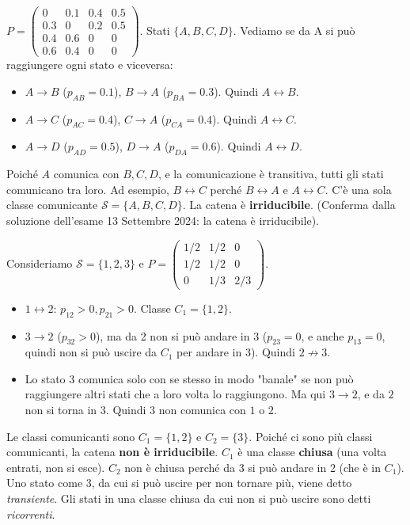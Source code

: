 \begin{example}
$P = \begin{pmatrix} 0 & 0.1 & 0.4 & 0.5 \\ 0.3 & 0 & 0.2 & 0.5 \\ 0.4 & 0.6 & 0 & 0 \\ 0.6 & 0.4 & 0 & 0 \end{pmatrix}$. Stati $\{A,B,C,D\}$.
Vediamo se da A si può raggiungere ogni stato e viceversa:
\begin{itemize}
    \item $A \to B$ ($p_{AB}=0.1$), $B \to A$ ($p_{BA}=0.3$). Quindi $A \leftrightarrow B$.
    \item $A \to C$ ($p_{AC}=0.4$), $C \to A$ ($p_{CA}=0.4$). Quindi $A \leftrightarrow C$.
    \item $A \to D$ ($p_{AD}=0.5$), $D \to A$ ($p_{DA}=0.6$). Quindi $A \leftrightarrow D$.
\end{itemize}
Poiché $A$ comunica con $B, C, D$, e la comunicazione è transitiva, tutti gli stati comunicano tra loro. Ad esempio, $B \leftrightarrow C$ perché $B \leftrightarrow A$ e $A \leftrightarrow C$.
C'è una sola classe comunicante $\mathcal{S}=\{A,B,C,D\}$.
La catena è \textbf{irriducibile}.
(Conferma dalla soluzione dell'esame 13 Settembre 2024: la catena è irriducibile).
\end{example}

\begin{example}
Consideriamo $\mathcal{S}=\{1,2,3\}$ e $P = \begin{pmatrix} 1/2 & 1/2 & 0 \\ 1/2 & 1/2 & 0 \\ 0 & 1/3 & 2/3 \end{pmatrix}$.
\begin{itemize}
    \item $1 \leftrightarrow 2$: $p_{12}>0, p_{21}>0$. Classe $C_1=\{1,2\}$.
    \item $3 \to 2$ ($p_{32}>0$), ma da 2 non si può andare in 3 ($p_{23}=0$, e anche $p_{13}=0$, quindi non si può uscire da $C_1$ per andare in 3). Quindi $2 \not\to 3$.
    \item Lo stato 3 comunica solo con se stesso in modo "banale" se non può raggiungere altri stati che a loro volta lo raggiungono. Ma qui $3 \to 2$, e da $2$ non si torna in $3$.
    Quindi $3$ non comunica con $1$ o $2$.
\end{itemize}
Le classi comunicanti sono $C_1=\{1,2\}$ e $C_2=\{3\}$.
Poiché ci sono più classi comunicanti, la catena \textbf{non è irriducibile}.
$C_1$ è una classe \textbf{chiusa} (una volta entrati, non si esce). $C_2$ non è chiusa perché da 3 si può andare in 2 (che è in $C_1$).
Uno stato come 3, da cui si può uscire per non tornare più, viene detto \textit{transiente}. Gli stati in una classe chiusa da cui non si può uscire sono detti \textit{ricorrenti}.
\end{example}


